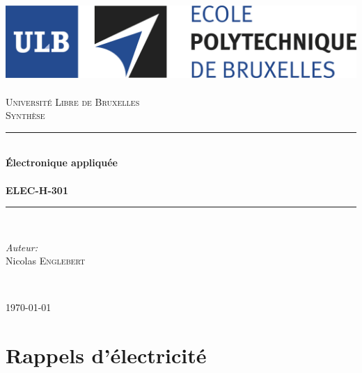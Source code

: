 \documentclass	[11pt, a4paper, openany]{book}
\begin{document}
\renewcommand{\proofname}{Démonstration}
\mainmatter
\begin{titlepage}
\begin{center}	
	
	\newcommand{\HRule}{\rule{\linewidth}{0.5mm}}   			%
	\includegraphics[scale=0.11]{logo.jpg}~\\[1cm]				%

	\textsc{\LARGE Université Libre de Bruxelles}\\[1.5cm]
	\textsc{\Large Synthèse}\\[0.5cm]

	\HRule \\[0.4cm]
	{ \huge \bfseries Électronique appliquée \\ \ \\ ELEC-H-301 \\[0.4cm] }


	\HRule \\[1.5cm]
		\begin{minipage}{0.4\textwidth}
		\begin{flushleft} \large
		
		\emph{Auteur:}\\
			Nicolas \textsc{Englebert}\\
			\end{flushleft}
			\end{minipage}
			\begin{minipage}{0.4\textwidth}
			\begin{flushright} \large
			\emph{} \\		
			\textsc{}
			\end{flushright}
		\end{minipage}

	\vfill

{\large \today}

\end{center}
\end{titlepage}

\tableofcontents



\mainmatter
\part{Rappels d'électricité}
\end{document}
